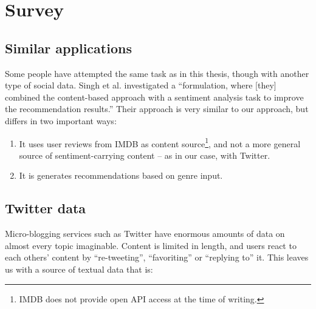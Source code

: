 
\chapter{Survey} %

\label{Chapter2} %




\section{Similar applications} %
\label{sec:similar_applications}

Some people have attempted the same task as in this thesis, though with another type of social data. Singh et al. \cite{Singh2011} investigated a ``formulation, where [they] combined the content-based approach with a sentiment analysis task to improve the recommendation results.'' Their approach is very similar to our approach, but differs in two important ways:

\begin{enumerate}
  \item It uses user reviews from IMDB as content source\footnote{IMDB does not provide open API access at the time of writing.}, and not a more general source of sentiment-carrying content -- as in our case, with Twitter.
  \item It is generates recommendations based on genre input.
\end{enumerate}



\section{Twitter data} %
\label{sec:twitter_data}

Micro-blogging services such as Twitter have enormous amounts of data on almost every topic imaginable. Content is limited in length, and users react to each others' content by ``re-tweeting'', ``favoriting'' or ``replying to'' it. This leaves us with a source of textual data that is:

